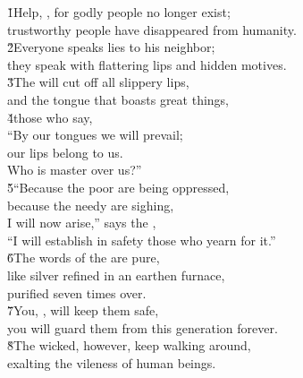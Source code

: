\begin{poetry}
\poeml \v{1}Help, , for godly people no longer exist; \\
\poemll    trustworthy people have disappeared from humanity. \\
\poeml \v{2}Everyone speaks lies to his neighbor; \\
\poemll    they speak with flattering lips and hidden motives. \\
\poeml \v{3}The  will cut off all slippery lips, \\
\poemll    and the tongue that boasts great things, \\
\poeml \v{4}those who say, \\
\poemll    ``By our tongues we will prevail; \\
\poemlll       our lips belong to us. \\
\poemll    Who is master over us?'' \\
\poeml \v{5}``Because the poor are being oppressed, \\
\poemll    because the needy are sighing, \\
\poemll    I will now arise,'' says the , \\
\poemlll       ``I will establish in safety those who yearn for it.'' \\
\poeml \v{6}The words of the  are pure, \\
\poemll    like silver refined in an earthen furnace, \\
\poemlll       purified seven times over. \\
\poeml \v{7}You, , will keep them safe, \\
\poemll    you will guard them from this generation forever. \\
\poeml \v{8}The wicked, however, keep walking around, \\
\poemll    exalting the vileness of human beings.
\end{poetry}

